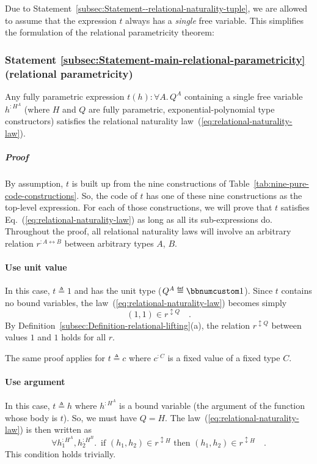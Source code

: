 Due to Statement~\ref{subsec:Statement--relational-naturality-tuple},
we are allowed to assume that the expression $t$ always has a \emph{single}
free variable. This simplifies the formulation of the relational parametricity
theorem:

\subsubsection{Statement \label{subsec:Statement-main-relational-parametricity}\ref{subsec:Statement-main-relational-parametricity}
(relational parametricity)}

Any fully parametric expression $t(h):\forall A.\,Q^{A}$ containing
a single free variable $h^{:H^{A}}$ (where $H$ and $Q$ are fully
parametric, exponential-polynomial type constructors) satisfies the
relational naturality law~(\ref{eq:relational-naturality-law}).

\subparagraph{Proof }

By assumption, $t$ is built up from the nine constructions of Table~\ref{tab:nine-pure-code-constructions}.
So, the code of $t$ has one of these nine constructions as the top-level
expression. For each of those constructions, we will prove that $t$
satisfies Eq.~(\ref{eq:relational-naturality-law}) as long as all
its sub-expressions do. Throughout the proof, all relational naturality
laws will involve an arbitrary relation $r^{:A\leftrightarrow B}$
between arbitrary types $A$, $B$.

\paragraph{Use unit value}

In this case, $t\triangleq1$ and has the unit type ($Q^{A}\triangleq\bbnum 1$).
Since $t$ contains no bound variables, the law~(\ref{eq:relational-naturality-law})
becomes simply
\[
(1,1)\in r^{\updownarrow Q}\quad.
\]
By Definition~\ref{subsec:Definition-relational-lifting}(a), the
relation $r^{\updownarrow Q}$ between values $1$ and $1$ holds
for all $r$.

The same proof applies for $t\triangleq c$ where $c^{:C}$ is a fixed
value of a fixed type $C$.

\paragraph{Use argument}

In this case, $t\triangleq h$ where $h^{:H^{A}}$ is a bound variable
(the argument of the function whose body is $t$). So, we must have
$Q=H$. The law~(\ref{eq:relational-naturality-law}) is then written
as
\[
\forall h_{1}^{:H^{A}},h_{2}^{:H^{B}}.\,\text{ if }(h_{1},h_{2})\in r^{\updownarrow H}\text{ then }(h_{1},h_{2})\in r^{\updownarrow H}\quad.
\]
This condition holds trivially.

